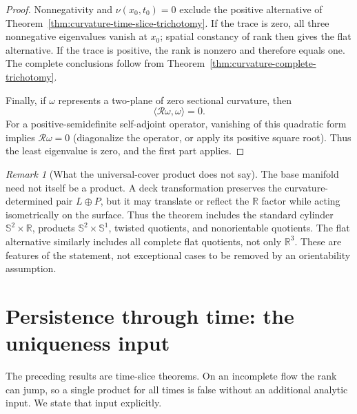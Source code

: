 \documentclass[10pt]{coll-l}
\newcommand{\R}{\mathbb{R}}
\newcommand{\Sph}{\mathbb{S}}
\theoremstyle{definition}
\theoremstyle{remark}
\newtheorem{remark}[theorem]{Remark}
\numberwithin{section}{chapter}
\numberwithin{equation}{chapter}
\begin{document}
\begin{proof}
Nonnegativity and $\nu(x_0,t_0)=0$ exclude the positive alternative of
Theorem~\ref{thm:curvature-time-slice-trichotomy}.  If the trace is zero,
all three nonnegative eigenvalues vanish at $x_0$; spatial constancy of rank
then gives the flat alternative.  If the trace is positive, the rank is
nonzero and therefore equals one.  The complete conclusions follow from
Theorem~\ref{thm:curvature-complete-trichotomy}.

Finally, if $\omega$ represents a two-plane of zero sectional curvature,
then
\[
                     \langle\mathcal R\omega,\omega\rangle=0.
\]
For a positive-semidefinite self-adjoint operator, vanishing of this
quadratic form implies $\mathcal R\omega=0$ (diagonalize the operator, or
apply its positive square root).  Thus the least eigenvalue is zero, and the
first part applies.
\end{proof}

\begin{remark}[What the universal-cover product does not say]
\label{rem:curvature-product-quotients}
The base manifold need not itself be a product.  A deck transformation
preserves the curvature-determined pair $L\oplus P$, but it may translate or
reflect the $\R$ factor while acting isometrically on the surface.  Thus the
theorem includes the standard cylinder $\Sph^2\times\R$, products
$\Sph^2\times\Sph^1$, twisted quotients, and nonorientable quotients.  The
flat alternative similarly includes all complete flat quotients, not only
$\R^3$.  These are features of the statement, not exceptional cases to be
removed by an orientability assumption.
\end{remark}

\section{Persistence through time: the uniqueness input}
\label{sec:curvature-whole-flow-splitting}

The preceding results are time-slice theorems.  On an incomplete flow the
rank can jump, so a single product for all times is false without an
additional analytic input.  We state that input explicitly.
\end{document}
